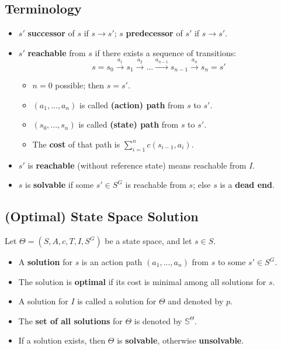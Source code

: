 \documentclass[conference, a4paper]{styles/acmsiggraph}
\begin{document}
    \subsection{Terminology}
        \begin{itemize}
            \item $s'$ \textbf{successor} of $s$ if $s \rightarrow s'$; $s$ \textbf{predecessor} of $s'$ if $s \rightarrow s'$.
            \item $s'$ \textbf{reachable} from $s$ if there exists a sequence of transitions:
                $$s = s_0 \xrightarrow{a_1} s_1 \xrightarrow{a_2} ... \xrightarrow{a_{n-1}} s_{n-1} \xrightarrow{a_n} s_n = s'$$
                \begin{itemize}
                    \item $n=0$ possible; then $s=s'$.
                    \item $(a_1,...,a_n)$ is called \textbf{(action) path} from $s$ to $s'$.
                    \item $(s_0,...,s_n)$ is called \textbf{(state) path} from $s$ to $s'$.
                    \item The \textbf{cost} of that path is $\sum\limits_{i=1}^n c(s_{i-1},a_i)$.
                \end{itemize}
            \item $s'$ is \textbf{reachable} (without reference state) means reachable from $I$.
            \item $s$ is \textbf{solvable} if some $s' \in S^G$ is reachable from $s$; else $s$ is a \textbf{dead end}.
        \end{itemize}
    
    
    \subsection{(Optimal) State Space Solution}
        Let $\Theta = (S,A,c,T,I,S^G)$ be a state space, and let $s\in S$.
        \begin{itemize}
            \item A \textbf{solution} for $s$ is an action path $(a_1,...,a_n)$ from $s$ to some $s' \in S^G$.
            \item The solution is \textbf{optimal} if its cost is minimal among all solutions for $s$.
            \item A solution for $I$ is called a solution for $\Theta$ and denoted by $p$.
            \item The \textbf{set of all solutions} for $\Theta$ is denoted by $\mathbb{S}^{\Theta}$.
            \item If a solution exists, then $\Theta$ is \textbf{solvable}, otherwise \textbf{unsolvable}.
        \end{itemize}
        
\end{document}
